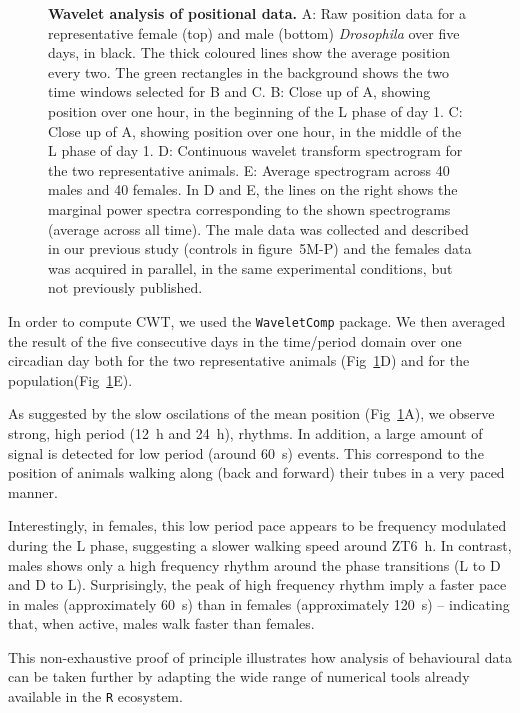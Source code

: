 \documentclass[10pt,letterpaper]{article}\usepackage[]{graphicx}\usepackage[]{color}
\begin{document}
\begin{figure}[!h]
	\caption{{\bf Wavelet analysis of positional data.}
		A: Raw position data for a representative female (top) and male (bottom) \emph{Drosophila} over five days, in black. 
		The thick coloured lines show the average position every two.
		The green rectangles in the background shows the two time windows selected for B and C.
		B: Close up of A, showing position over one hour, in the beginning of the L phase of day 1.
		C: Close up of A, showing position over one hour, in the middle of the L phase of day 1.
		D: Continuous wavelet transform spectrogram for the two representative animals.
		E: Average spectrogram across 40 males and 40 females.
		In D and E, the lines on the right shows the marginal power spectra corresponding to the shown spectrograms (average across all time).
		The male data was collected and described in our previous study \cite{geissmann_ethoscopes:_2017} (controls in figure~5M-P) and the females data was acquired in parallel, in the same experimental conditions, but not previously published.
	}
	\label{fig:fig-6}
\end{figure}



In order to compute CWT, we used the \texttt{WaveletComp} package\cite{schmidbauer_waveletcomp:_2018}.
We then averaged the result of the five consecutive days in the time/period domain over one circadian day both for the two representative animals (Fig~\ref{fig:fig-6}D)
and for the population(Fig~\ref{fig:fig-6}E).

As suggested by the slow oscilations of the mean position (Fig~\ref{fig:fig-6}A), we observe strong, high period (12~h and 24~h), rhythms.
In addition, a large amount of signal is detected for low period (around 60~s) events.
This correspond to the position of animals walking along (back and forward) their tubes in a very paced manner.

Interestingly, in females, this low period pace appears to be frequency modulated during the L phase, suggesting a slower walking speed around ZT6~h.
In contrast, males shows only a high frequency rhythm around the phase transitions (L to D and D to L).
Surprisingly, the peak of high frequency rhythm imply a faster pace in males (approximately 60~s) than in females (approximately 120~s) --
indicating that, when active, males walk faster than females. 

This non-exhaustive proof of principle illustrates how analysis of behavioural data can be taken further by adapting the wide range of numerical tools already available in the \texttt{R} ecosystem. 
\end{document}
